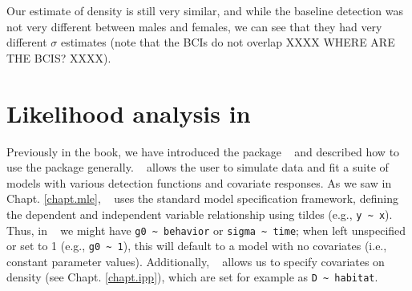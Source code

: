 Our estimate of density is still very similar, and while the baseline detection was not very different
between males and females, we can see that they had very different $\sigma$ estimates (note that the BCIs do not
overlap XXXX WHERE ARE THE BCIS? XXXX).  




\section{Likelihood analysis in \secr}

\begin{comment}
XXX THIS ENTIRE PARAGRAPH IS UNCLEAR - WHY IS IT THERE AND WHAT DOES IT WANT TO SAY? XXXX

Before we describe the types of covariates and demonstrate how to
implement them, a brief note about the different inference approaches.
In taking a Bayesian approach to analysis of covariate models,
inference is always based on analysis of the ``joint likelihood''
based on data augmentation. That is, the conditional-on-N likelihood,
with $N$ removed by integration (as described in
Chapt. \ref{chapt.closed} XXXXXX specific section XXXXX).
However, likelihood analysis
based on the conditional likelihood is often done in practice and, in
particular, in the {\tt secr} package. XXX THIS SENTENCE ISNT CLEAR TO ME XXXX A variant of the conditional
likelihood which is kind of distinct and relevant to the individual
covariates is the ``Huggins-Alho'' idea which is based on thinking
about Horwitz-Thompson estimators involving unequal probabilities of
sampling. XXX I DONT THINK THIS MEANS ANYTHING TO MOST READERS WITHOUT ADDITIONAL EXPLANATION XXX 
\end{comment}

Previously in the book, we have introduced the \R package \secr~ and described how
to use the package generally. 
 \secr~ allows the user to simulate data and fit a
suite of models with various detection functions and covariate
responses.  As we saw in Chapt. \ref{chapt.mle}, \secr~ uses the standard \R model
specification framework, defining the dependent and independent
variable relationship using tildes
(e.g., \Verb+y ~ x+).
Thus, in \secr~ we
might have \verb+g0 ~ behavior+ or \verb+sigma ~ time+;
when left unspecified or set
to 1 (e.g., \verb+g0 ~ 1+), this will default to a model with no
covariates
(i.e., constant parameter values).
Additionally, \secr~ allows us to specify covariates 
on density (see Chapt. \ref{chapt.ipp}),
which are set for example as \verb+D ~ habitat+.

